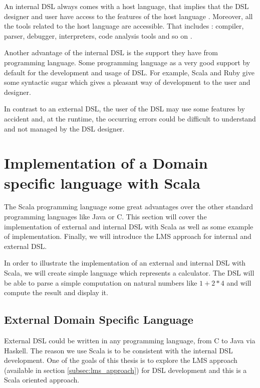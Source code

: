 An internal \gls{DSL} always comes with a host language, that implies that the
\gls{DSL} designer and user have access to the features of the host language
\cite{strembeckmarkzdunuwe2009}. Moreover, all the tools related to the host
language are accessible. That includes : compiler, parser, debugger,
interpreters, code analysis tools and so on \cite{strembeckmarkzdunuwe2009}.

Another advantage of the internal \gls{DSL} is the support they have from
programming language. Some programming language as a very good support by
default for the development and usage of \gls{DSL}. For example, Scala and Ruby
give some syntactic sugar which gives a pleasant way of development to the
user and designer.

In contrast to an external \gls{DSL}, the user of the \gls{DSL} may use some
features by accident and, at the runtime, the occurring errors could be
difficult to understand and not managed by the \gls{DSL} designer.

\section{Implementation of a Domain specific language with Scala}
\label{sec:implementation_of_a_dsl}

The Scala programming language some great advantages over the other standard
programming languages like Java or C. This section will cover the implementation
of external and internal \gls{DSL} with Scala as well as some example of
implementation. Finally, we will introduce the \gls{LMS} approach for internal
and external \gls{DSL}.

In order to illustrate the implementation of an external and internal \gls{DSL}
with Scala, we will create simple language which represents a calculator. The
\gls{DSL} will be able to parse a simple computation on natural numbers like $1 +
2 * 4$ and will compute the result and display it.

\subsection{External Domain Specific Language}
\label{subsec:scala_external_dsl}

External \gls{DSL} could be written in any programming language, from C to Java
via Haskell. The reason we use Scala is to be consistent with the internal
\gls{DSL} development. One of the goals of this thesis is to explore the
\gls{LMS} approach (available in section \ref{subsec:lms_approach}) for
\gls{DSL} development and this is a Scala oriented approach.

